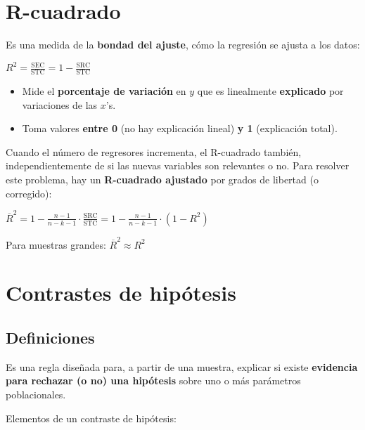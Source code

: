 \documentclass[10pt, a4paper, landscape]{article}
\newcommand{\SSR}{\mathrm{SRC}}
\newcommand{\SSE}{\mathrm{SEC}}
\newcommand{\SST}{\mathrm{STC}}
\begin{document}
\begin{multicols}{3}
		\section*{R-cuadrado}
		
		Es una medida de la \textbf{bondad del ajuste}, cómo la regresión se ajusta a los datos:
		
		\begin{center}
			$R^{2} = \frac{\SSE}{\SST} = 1 - \frac{\SSR}{\SST}$
		\end{center}
		
		\begin{itemize}[leftmargin=*]
			\item Mide el \textbf{porcentaje de variación} en $y$ que es linealmente \textbf{explicado} por variaciones de las $x$'s.
			\item Toma valores \textbf{entre 0} (no hay explicación lineal) \textbf{y 1} (explicación total).
		\end{itemize}
		
		Cuando el número de regresores incrementa, el R-cuadrado también, independientemente de si las nuevas variables son relevantes o no. Para resolver este problema, hay un \textbf{R-cuadrado ajustado} por grados de libertad (o corregido):
		
		\begin{center}
			$\overline{R}^{2} = 1 - \frac{n - 1}{n - k - 1} \cdot \frac{\SSR}{\SST} = 1 - \frac{n - 1}{n - k - 1} \cdot (1 - R^{2})$
		\end{center}
		
		Para muestras grandes: $\overline{R}^{2} \approx R^{2}$
		
		\section*{Contrastes de hipótesis}
		
		\subsection*{Definiciones}
		
		Es una regla diseñada para, a partir de una muestra, explicar si existe \textbf{evidencia para rechazar (o no) una hipótesis} sobre uno o más parámetros poblacionales.
		
		Elementos de un contraste de hipótesis:
		

\end{multicols}
\end{document}
